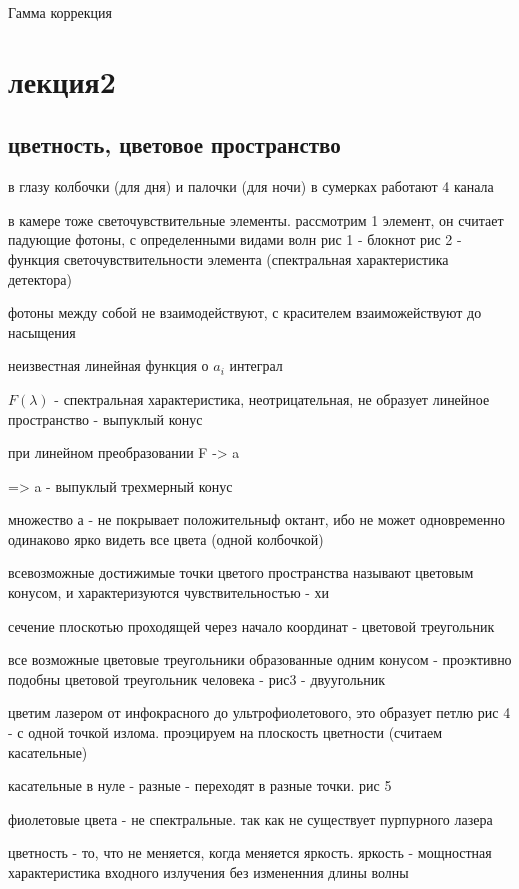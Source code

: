 \documentclass[]{report}
\begin{document}
Гамма коррекция

\chapter{лекция2}

\section{цветность, цветовое пространство}
в глазу колбочки (для дня) и палочки (для ночи)
в сумерках работают 4 канала

в камере тоже светочувствительные элементы.
рассмотрим 1 элемент, он считает падующие фотоны, с определенными видами волн
рис 1 - блокнот
рис 2 - функция светочувствительности элемента (спектральная характеристика детектора)

фотоны между собой не взаимодействуют, с красителем взаиможействуют до насыщения



неизвестная линейная функция о $a_i$
интеграл

$F(\lambda)$ - спектральная характеристика, неотрицательная, не образует линейное пространство - выпуклый конус

при линейном преобразовании F -> a

=> a - выпуклый трехмерный конус

множество а - не покрывает положительныф октант, ибо не может одновременно одинаково ярко видеть все цвета (одной колбочкой)

всевозможные достижимые точки цветого пространства называют цветовым конусом, и характеризуются чувствительностью - хи

сечение плоскотью проходящей через начало координат - цветовой треугольник

все возможные цветовые треугольники образованные одним конусом - проэктивно подобны
цветовой треугольник человека - рис3 - двуугольник

цветим лазером от инфокрасного до ультрофиолетового, это образует петлю рис 4 - с одной точкой излома. проэцируем на плоскость цветности (считаем касательные)

касательные в нуле - разные - переходят в разные точки. рис 5

фиолетовые цвета - не спектральные. так как не существует пурпурного лазера

цветность - то, что не меняется, когда меняется яркость. яркость - мощностная характеристика входного излучения без измененния длины волны
\end{document}
